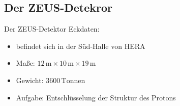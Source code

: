 \documentclass[aspectratio=1610, 9pt]{beamer}
\begin{document}
\subsection{Der ZEUS-Detekror}
\begin{frame}{Der ZEUS-Detektor}
Eckdaten:
  \begin{itemize}
    \item{befindet sich in der Süd-Halle von HERA}
    \item{Maße: $12 \,\mathrm{m} \times 10 \,\mathrm{m} \times 19 \,\mathrm{m}  $  } 
    \item{Gewicht: $3600 \,\mathrm{Tonnen}$ } 
    \item{Aufgabe: Entschlüsselung der Struktur des Protons}
  \end{itemize}
\end{frame}
\end{document}
